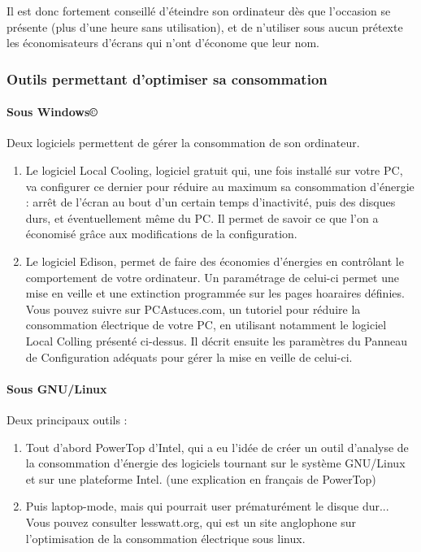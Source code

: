 \documentclass[a4paper,11pt,french]{report}
\begin{document}
Il est donc fortement conseillé d'éteindre son ordinateur dès que l'occasion se présente (plus d'une heure sans utilisation), et de n'utiliser sous aucun prétexte les économisateurs d'écrans qui n'ont d'économe que leur nom.



\subsubsection{Outils permettant d'optimiser sa consommation}
\paragraph{Sous Windows\copyright}

Deux logiciels permettent de gérer la consommation de son ordinateur.
\begin{enumerate}
\item Le logiciel Local Cooling, logiciel gratuit qui, une fois installé sur votre PC, va configurer ce dernier pour réduire au maximum sa consommation d'énergie : arrêt de l'écran au bout d'un certain temps d'inactivité, puis des disques durs, et éventuellement même du PC. Il permet de savoir ce que l'on a économisé grâce aux modifications de la configuration.
\item Le logiciel Edison, permet de faire des économies d'énergies en contrôlant le comportement de votre ordinateur. Un paramétrage de celui-ci permet une mise en veille et une extinction programmée sur les pages hoaraires définies.
Vous pouvez suivre sur PCAstuces.com, un tutoriel pour réduire la consommation électrique de votre PC, en utilisant notamment le logiciel Local Colling présenté ci-dessus. Il décrit ensuite les paramètres du Panneau de Configuration adéquats pour gérer la mise en veille de celui-ci.
\end{enumerate}

\paragraph{Sous GNU/Linux}
Deux principaux outils :

\begin{enumerate}
\item Tout d'abord PowerTop d'Intel, qui a eu l'idée de créer un outil d'analyse de la consommation d'énergie des logiciels tournant sur le système GNU/Linux et sur une plateforme Intel. (une explication en français de PowerTop)
\item Puis laptop-mode, mais qui pourrait user prématurément le disque dur...
Vous pouvez consulter lesswatt.org, qui est un site anglophone sur l'optimisation de la consommation électrique sous linux.
\end{enumerate}
\end{document}
